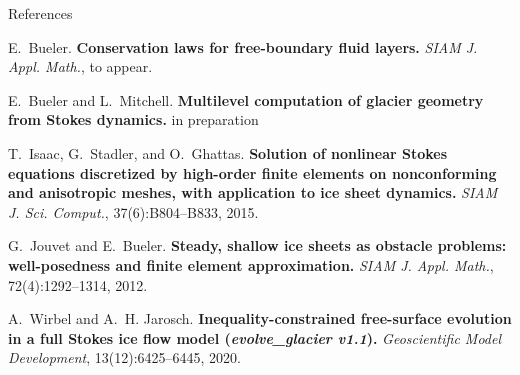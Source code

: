 \documentclass{beamer}
\begin{document}


\appendix

\begin{frame}{References}

%
%

\begin{thebibliography}{1}
E.~Bueler. \textbf{Conservation laws for free-boundary fluid layers.} {\em SIAM J. Appl. Math.}, to appear.

E.~Bueler and L.~Mitchell. \textbf{Multilevel computation of glacier geometry from Stokes dynamics.} in preparation

T.~Isaac, G.~Stadler, and O.~Ghattas.  \textbf{Solution of nonlinear Stokes equations discretized by high-order finite elements on nonconforming and anisotropic meshes, with application to ice sheet dynamics.} {\em SIAM J. Sci. Comput.}, 37(6):B804--B833, 2015.

G.~Jouvet and E.~Bueler. \textbf{Steady, shallow ice sheets as obstacle problems: well-posedness and finite element approximation.} {\em SIAM J. Appl. Math.}, 72(4):1292--1314, 2012.

A.~Wirbel and A.~H. Jarosch. \textbf{Inequality-constrained free-surface evolution in a full {S}tokes ice flow model (\textit{evolve\_glacier v1.1}).} {\em Geoscientific Model Development}, 13(12):6425--6445, 2020.
\end{thebibliography}

\end{frame}
\end{document}
